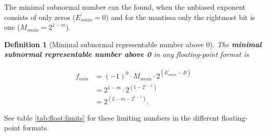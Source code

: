 \documentclass{article}
\theoremstyle{plain} %
\newtheorem{definition}{Definition}[section]
\theoremstyle{convention} %
\theoremstyle{remark} %
\def\df#1{\textbf{\textit{#1}}}
\numberwithin{equation}{section}
\begin{document}
The minimal subnormal number can the found, when the unbiased exponent consists of only zeros ($E^{\prime}_{smin} = 0$) and for the mantissa only the rightmost bit is one ($M_{smin} = 2^{1-m}$).

\begin{definition}[Minimal subnormal representable number above \num{0}]

The \df{minimal subnormal representable number above \num{0}} in any floating-point format is

\begin{align*}
    f_{min} &= (-1)^0 \cdot M_{smin} \cdot 2^{(E^{\prime}_{smin} - B)} \\
            &= 2^{1-m} \cdot 2^{(1 - 2^{e-1})} \\
            &= 2^{(2 -m -2^{e-1})}.
\end{align*}

\end{definition}

See table \ref{tab:float:limits} for these limiting numbers in the different floating-point formats.
\end{document}
